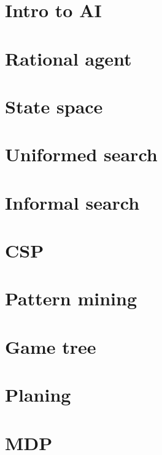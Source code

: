\documentclass{article}
\begin{document}


\tableofcontents
\clearpage
{}
\setcounter{page}{1}

\section{Intro to AI}

\section{Rational agent}

\section{State space}

\section{Uniformed search}

\section{Informal search}

\section{CSP}

\section{Pattern mining}

\section{Game tree}

\section{Planing}

\section{MDP}

\clearpage
\end{document}
